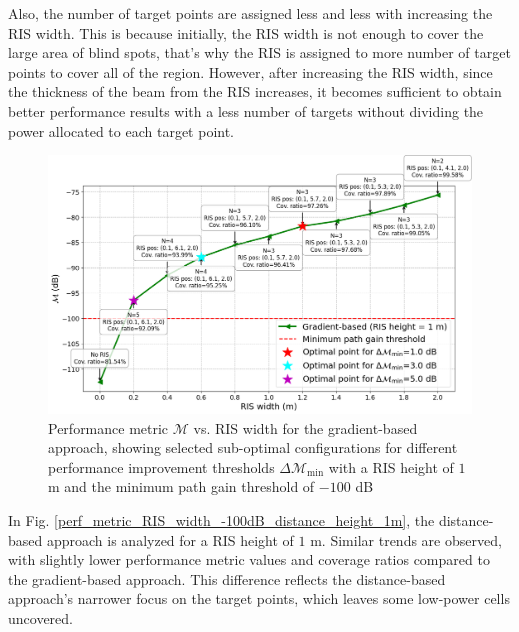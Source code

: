 \documentclass{IEEEoj}
\begin{document}
Also, the number of target points are assigned less and less with increasing the RIS width. This is because initially, the RIS width is not enough to cover the large area of blind spots, that's why the RIS is assigned to more number of target points to cover all of the region. However, after increasing the RIS width, since the thickness of the beam from the RIS increases, it becomes sufficient to obtain better performance results with a less number of targets without dividing the power allocated to each target point.

\begin{figure}
	\centering
	\includegraphics[width=\linewidth]{Sim_Results/perf_metric_RIS_width_-100dB_gradient_height_1m.png}
	\caption{Performance metric $\mathcal{M}$ vs. RIS width for the gradient-based approach, showing selected sub-optimal configurations for different performance improvement thresholds $\Delta \mathcal{M}_{\text{min}}$ with a RIS height of $1$ m and the minimum path gain threshold of $-100$ dB}
	\label{perf_metric_RIS_width_-100dB_gradient_height_1m}
\end{figure}

In Fig. \ref{perf_metric_RIS_width_-100dB_distance_height_1m}, the distance-based approach is analyzed for a RIS height of $1$ m. Similar trends are observed, with slightly lower performance metric values and coverage ratios compared to the gradient-based approach. This difference reflects the distance-based approach’s narrower focus on the target points, which leaves some low-power cells uncovered.
\end{document}
